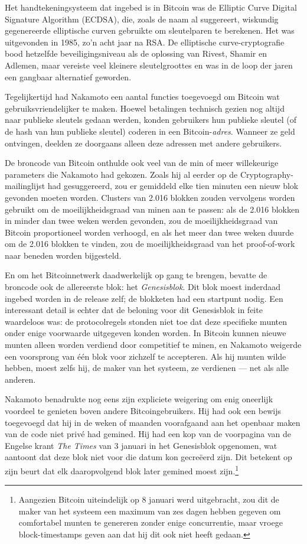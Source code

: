 \documentclass[
  a5paper,
  smalldemyvopaper,11pt,twoside,onecolumn,openright,extrafontsizes,
hidelinks]{memoir}
\begin{document}
Het handtekeningsysteem dat ingebed is in Bitcoin was de Elliptic Curve
Digital Signature Algorithm (ECDSA), die, zoals de naam al suggereert,
wiskundig gegenereerde elliptische curven gebruikte om sleutelparen te
berekenen. Het was uitgevonden in 1985, zo'n acht jaar na RSA. De
elliptische curve-cryptografie bood hetzelfde beveiligingsniveau als de
oplossing van Rivest, Shamir en Adlemen, maar vereiste veel kleinere
sleutelgroottes en was in de loop der jaren een gangbaar alternatief
geworden.

Tegelijkertijd had Nakamoto een aantal functies toegevoegd om Bitcoin
wat gebruiksvriendelijker te maken. Hoewel betalingen technisch gezien
nog altijd naar publieke sleutels gedaan werden, konden gebruikers hun
publieke sleutel (of de hash van hun publieke sleutel) coderen in een
Bitcoin-\emph{adres}. Wanneer ze geld ontvingen, deelden ze doorgaans
alleen deze adressen met andere gebruikers.

De broncode van Bitcoin onthulde ook veel van de min of meer
willekeurige parameters die Nakamoto had gekozen. Zoals hij al eerder op
de Cryptography-mailinglijst had gesuggereerd, zou er gemiddeld elke
tien minuten een nieuw blok gevonden moeten worden. Clusters van 2.016
blokken zouden vervolgens worden gebruikt om de moeilijkheidsgraad van
minen aan te passen: als de 2.016 blokken in minder dan twee weken
werden gevonden, zou de moeilijkheidsgraad van Bitcoin proportioneel
worden verhoogd, en als het meer dan twee weken duurde om de 2.016
blokken te vinden, zou de moeilijkheidsgraad van het proof-of-work naar
beneden worden bijgesteld.

En om het Bitcoinnetwerk daadwerkelijk op gang te brengen, bevatte de
broncode ook de allereerste blok: het \emph{Genesisblok}. Dit blok moest
inderdaad ingebed worden in de release zelf; de blokketen had een
startpunt nodig. Een interessant detail is echter dat de beloning voor
dit Genesisblok in feite waardeloos was: de protocolregels stonden niet
toe dat deze specifieke munten onder enige voorwaarde uitgegeven konden
worden. In Bitcoin kunnen nieuwe munten alleen worden verdiend door
competitief te minen, en Nakamoto weigerde een voorsprong van één blok
voor zichzelf te accepteren. Als hij munten wilde hebben, moest zelfs
hij, de maker van het systeem, ze verdienen --- net als alle anderen.

Nakamoto benadrukte nog eens zijn expliciete weigering om enig oneerlijk
voordeel te genieten boven andere Bitcoingebruikers. Hij had ook een
bewijs toegevoegd dat hij in de weken of maanden voorafgaand aan het
openbaar maken van de code niet privé had gemined. Hij had een kop van
de voorpagina van de Engelse krant \emph{The Times} van 3 januari in het
Genesisblok opgenomen, wat aantoont dat deze blok niet voor die datum
kon gecreëerd zijn. Dit betekent op zijn beurt dat elk daaropvolgend
blok later gemined moest zijn.\footnote{Aangezien Bitcoin uiteindelijk
  op 8 januari werd uitgebracht, zou dit de maker van het systeem een
  maximum van zes dagen hebben gegeven om comfortabel munten te
  genereren zonder enige concurrentie, maar vroege block-timestamps
  geven aan dat hij dit ook niet heeft gedaan.}
\end{document}
